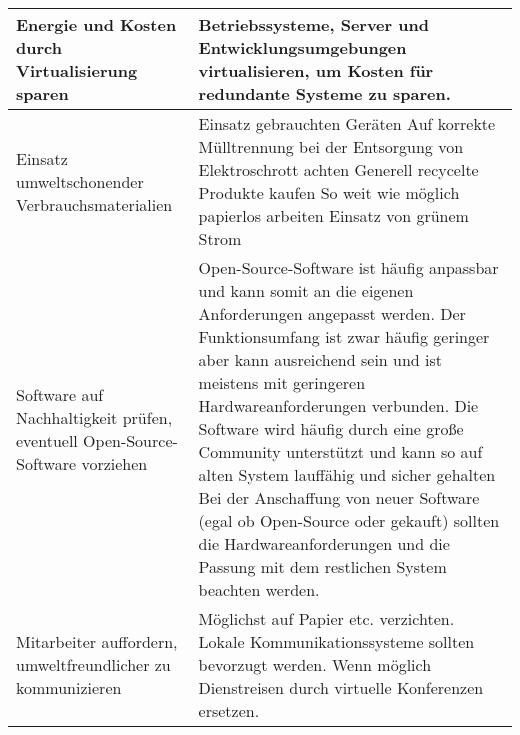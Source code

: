 \documentclass[asp1.tex]{subfiles}
\begin{document}
\begin{table}[H]
\begin{tabular}{|p{}|p{}|}
        Energie und Kosten durch Virtualisierung sparen                                                   & Betriebssysteme, Server und Entwicklungsumgebungen virtualisieren, um Kosten für redundante Systeme zu sparen.

        \\\hline

        Einsatz umweltschonender Verbrauchsmaterialien                                                    & Einsatz gebrauchten Geräten
        \newline Auf korrekte Mülltrennung bei der Entsorgung von Elektroschrott achten
        \newline Generell recycelte Produkte kaufen
        \newline So weit wie möglich papierlos arbeiten
        \newline Einsatz von grünem Strom

        \\\hline

        Software auf Nachhaltigkeit prüfen, eventuell Open-Source-Software vorziehen                      & Open-Source-Software ist häufig anpassbar und kann somit an die eigenen Anforderungen angepasst werden.
        \newline Der Funktionsumfang ist zwar häufig geringer aber kann ausreichend sein und ist meistens mit geringeren Hardwareanforderungen verbunden.
        \newline Die Software wird häufig durch eine große Community unterstützt und kann so auf alten System lauffähig und sicher gehalten
        \newline Bei der Anschaffung von neuer Software (egal ob Open-Source oder gekauft) sollten die Hardwareanforderungen und die Passung mit dem restlichen System beachten werden.

        \\\hline

        Mitarbeiter auffordern, umweltfreundlicher zu kommunizieren                                       & Möglichst auf Papier etc. verzichten.
        \newline Lokale Kommunikationssysteme sollten bevorzugt werden.
        \newline Wenn möglich Dienstreisen durch virtuelle Konferenzen ersetzen.



        \\\hline
    \end{tabular}
\end{table}
\end{document}
